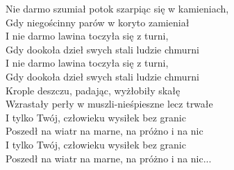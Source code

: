 
Nie darmo szumiał potok szarpiąc się w kamieniach, \\
Gdy niegościnny parów w koryto zamieniał \\
\hops
{} I nie darmo lawina toczyła się z turni, \\
 Gdy dookoła dzieł swych stali ludzie chmurni \\
\hops
{} I nie darmo lawina toczyła się z turni, \\
 Gdy dookoła dzieł swych stali ludzie chmurni \\
\hops
Krople deszczu, padając, wyżłobiły skałę \\
Wzrastały perły w muszli-nieśpieszne lecz trwałe \\
\hops
{} I tylko Twój, człowieku wysiłek bez granic \\
 Poszedł na wiatr na marne, na próżno i na nic \\
\hops
{} I tylko Twój, człowieku wysiłek bez granic \\
 Poszedł na wiatr na marne, na próżno i na nic...